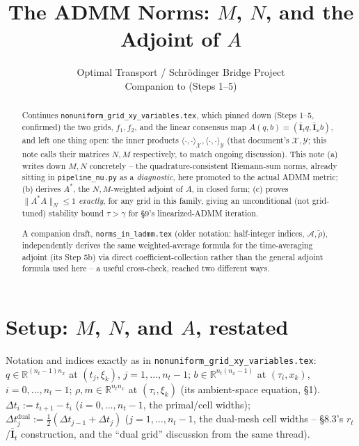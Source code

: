 \documentclass[11pt]{article}
\title{The ADMM Norms: $M$, $N$, and the Adjoint of $A$}
\author{Optimal Transport / Schr\"odinger Bridge Project\\
Companion to \code{nonuniform\_grid\_xy\_variables.tex} (Steps 1--5)}
\date{}
\newcommand{\dt}{\Delta t}
\newcommand{\code}[1]{\texttt{#1}}
\begin{document}
\maketitle

\begin{abstract}
Continues \code{nonuniform\_grid\_xy\_variables.tex}, which pinned down (Steps 1--5,
confirmed) the two grids, $f_1,f_2$, and the linear consensus map $A(q,b)=(\bar{\mathbf
I}_tq,\bar{\mathbf I}_xb)$, and left one thing open: the inner products
$\langle\cdot,\cdot\rangle_\mathcal{X},\langle\cdot,\cdot\rangle_\mathcal{Y}$ (that
document's $\mathcal X,\mathcal Y$; this note calls their matrices $N,M$ respectively, to
match ongoing discussion). This note (a) writes down $M,N$ concretely -- the
quadrature-consistent Riemann-sum norms, already sitting in \code{pipeline\_nu.py} as a
\emph{diagnostic}, here promoted to the actual ADMM metric; (b) derives $A^*$, the
$N,M$-weighted adjoint of $A$, in closed form; (c) proves $\|A^*A\|_N\le1$
\emph{exactly}, for any grid in this family, giving an unconditional (not
grid-tuned) stability bound $\tau>\gamma$ for \S9's linearized-ADMM iteration.

A companion draft, \code{norms\_in\_ladmm.tex} (older notation: half-integer indices,
$\mathcal A,\tilde\rho$), independently derives the same weighted-average formula for the
time-averaging adjoint (its Step 5b) via direct coefficient-collection rather than the
general adjoint formula used here -- a useful cross-check, reached two different ways.
\end{abstract}

\section{Setup: $M$, $N$, and $A$, restated}
\label{sec:setup}

Notation and indices exactly as in \code{nonuniform\_grid\_xy\_variables.tex}: $q\in
\mathbb R^{(n_t-1)n_x}$ at $(t_j,\xi_k)$, $j=1,\ldots,n_t-1$; $b\in\mathbb
R^{n_t(n_x-1)}$ at $(\tau_i,x_k)$, $i=0,\ldots,n_t-1$; $\rho,m\in\mathbb R^{n_tn_x}$ at
$(\tau_i,\xi_k)$ (its ambient-space equation, \S1). $\dt_i:=t_{i+1}-t_i$
($i=0,\ldots,n_t-1$, the primal/cell widths); $\dt_j^{\mathrm{dual}}:=\tfrac12(\dt_{j-1}
+\dt_j)$ ($j=1,\ldots,n_t-1$, the dual-mesh cell widths -- \S8.3's $r_t$/$\bar{\mathbf
I}_t$ construction, and the ``dual grid'' discussion from the same thread).
\end{document}

